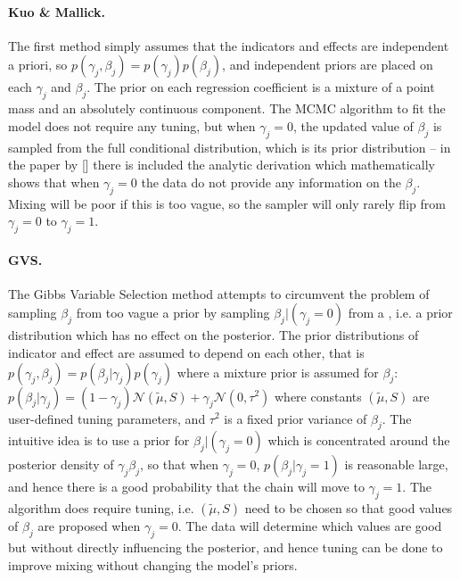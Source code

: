 \documentclass[11 pt]{article}
\begin{document}
\begin{multicols}{2}
 \paragraph{Kuo \& Mallick.} The first method simply assumes that the indicators and effects are independent a priori, so $p(\gamma_j, \beta_j) = p(\gamma_j)p(\beta_j)$, and independent priors are placed on each $\gamma_j$ and $\beta_j$. The prior on each regression
coefficient is a mixture of a point mass and an absolutely continuous component. The MCMC algorithm to fit the model does not require any tuning, but when $\gamma_j = 0$, the updated value of $\beta_j$ is sampled from the full conditional distribution, which is its prior distribution -- in the paper by [\cite{Kuo1998}] there is included the analytic derivation which mathematically shows that when $\gamma_j = 0$ the data do not provide any information on the $\beta_j$. Mixing will be poor if this is too vague, so the sampler will only rarely flip from $\gamma_j = 0$ to $\gamma_j = 1$.

\paragraph{GVS.} The Gibbs Variable Selection method attempts to circumvent the problem of sampling $\beta_j$ from too vague a prior by sampling $\beta_j | (\gamma_j = 0)$ from a , i.e. a prior distribution which has no effect on the posterior. The prior distributions of indicator and effect are assumed to depend on each other, that is $p(\gamma_j, \beta_j) = p(\beta_j | \gamma_j)p(\gamma_j)$ where a mixture prior is assumed for $\beta_j$: $p(\beta_j | \gamma_j) = (1-\gamma_j)\mathcal{N}(\tilde{\mu}, S)+\gamma_j\mathcal{N}(0, \tau^2)$ where constants $(\tilde{\mu}, S)$ are user-defined tuning parameters, and $\tau^2$ is a fixed prior variance of $\beta_j$. The intuitive idea is to use a prior for $\beta_j | (\gamma_j = 0)$ which is concentrated around the posterior density of $\gamma_j\beta_j$, so that when $\gamma_j = 0$, $p(\beta_j | \gamma_j = 1)$ is reasonable large, and hence there is a good probability that the chain will move to $\gamma_j = 1$. The algorithm does require tuning, i.e. $(\tilde{\mu}, S)$ need to be chosen so that good values of $\beta_j$ are proposed when $\gamma_j = 0$. The data will determine which values are good but without directly influencing the posterior, and hence tuning can be done to improve mixing without changing the model’s priors.


\end{multicols}
\end{document}
